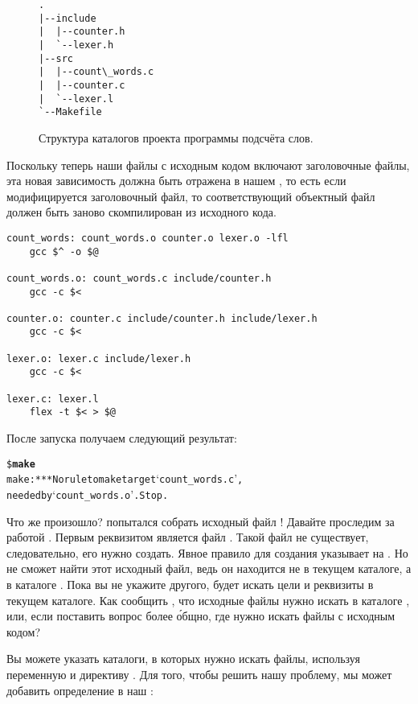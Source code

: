 \begin{figure}
{\footnotesize
\begin{verbatim}
.
|--include
|  |--counter.h
|  `--lexer.h
|--src
|  |--count\_words.c
|  |--counter.c
|  `--lexer.l
`--Makefile
\end{verbatim}
}
\caption{Структура каталогов проекта программы подсчёта слов.}
\label{fig:ex_src_tree}
\end{figure}

Поскольку теперь наши файлы с исходным кодом включают заголовочные
файлы, эта новая зависимость должна быть отражена в нашем \Makefile{},
то есть если модифицируется заголовочный файл, то соответствующий
объектный файл должен быть заново скомпилирован из исходного кода.

{\footnotesize
\begin{verbatim}
count_words: count_words.o counter.o lexer.o -lfl
    gcc $^ -o $@

count_words.o: count_words.c include/counter.h
    gcc -c $<

counter.o: counter.c include/counter.h include/lexer.h
    gcc -c $<

lexer.o: lexer.c include/lexer.h
    gcc -c $<

lexer.c: lexer.l
    flex -t $< > $@
\end{verbatim}
}

После запуска \GNUmake{} получаем следующий результат:

{\footnotesize
\begin{alltt}
\$ \textbf{make}
make:  *** No rule to make target `count\_words.c',
       needed by `count\_words.o'.  Stop.
\end{alltt}
}

Что же произошло? \GNUmake{} попытался собрать исходный файл
! Давайте проследим за работой \GNUmake{}.
Первым реквизитом является файл . Такой файл
не существует, следовательно, его нужно создать. Явное правило для
создания  указывает на
. Но \GNUmake{} не сможет найти этот
исходный файл, ведь он находится не в текущем каталоге, а в каталоге
. Пока вы не укажите другого, \GNUmake{} будет искать
цели и реквизиты в текущем каталоге. Как сообщить \GNUmake{}, что
исходные файлы нужно искать в каталоге , или, если
поставить вопрос более \'{о}бщно, где нужно искать файлы с исходным
кодом?

Вы можете указать \GNUmake{} каталоги, в которых нужно искать
файлы, используя переменную  и директиву
. Для того, чтобы решить нашу проблему, мы может
добавить определение  в наш \Makefile{}:

